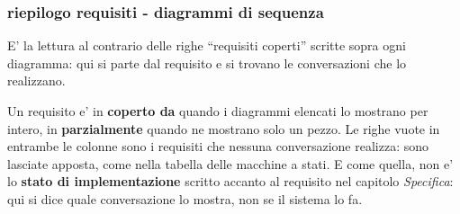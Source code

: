 \documentclass[11pt]{article}
\begin{document}
\subsubsection{riepilogo requisiti - diagrammi di sequenza}
\label{sec:orge2a2a4f}

E' la lettura al contrario delle righe ``requisiti coperti'' scritte sopra ogni diagramma: qui si
parte dal requisito e si trovano le conversazioni che lo realizzano.

Un requisito e' in \textbf{coperto da} quando i diagrammi elencati lo mostrano per intero, in
\textbf{parzialmente} quando ne mostrano solo un pezzo. Le righe vuote in entrambe le colonne sono i
requisiti che nessuna conversazione realizza: sono lasciate apposta, come nella tabella delle
macchine a stati. E come quella, non e' lo \textbf{stato di implementazione} scritto accanto al requisito
nel capitolo \emph{Specifica}: qui si dice quale conversazione lo mostra, non se il sistema lo fa.
\end{document}
